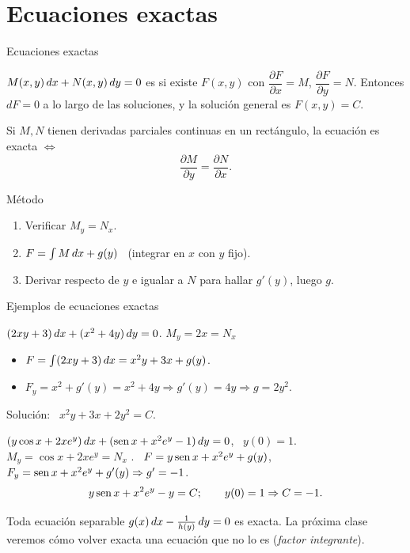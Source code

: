 \documentclass[10pt,aspectratio=169]{beamer}
\begin{document}
\section{Ecuaciones exactas}

\begin{frame}{Ecuaciones exactas}
  \begin{definicion}
    $M(x,y)\,dx+N(x,y)\,dy=0$ es  si existe $F(x,y)$ con $\dfrac{\partial F}{\partial x}=M$, $\dfrac{\partial F}{\partial y}=N$.
    Entonces $dF=0$ a lo largo de las soluciones, y la solución general es $\boxed{F(x,y)=C}$.
  \end{definicion}
  \begin{teorema}
    Si $M,N$ tienen derivadas parciales continuas en un rectángulo, la ecuación es exacta $\iff$
    \[ \frac{\partial M}{\partial y}=\frac{\partial N}{\partial x}. \]
  \end{teorema}
  \begin{block}{Método}
    \begin{enumerate}
      \item Verificar $M_y=N_x$.
      \item $F=\int M\,dx+g(y)$ \ (integrar en $x$ con $y$ fijo).
      \item Derivar respecto de $y$ e igualar a $N$ para hallar $g'(y)$, luego $g$.
    \end{enumerate}
  \end{block}
\end{frame}

\begin{frame}{Ejemplos de ecuaciones exactas}
  \begin{ejemplo}[7]
    $(2xy+3)\,dx+(x^2+4y)\,dy=0$. \quad $M_y=2x=N_x$ \checkmark
    \begin{itemize}
      \item $F=\int(2xy+3)\,dx=x^2y+3x+g(y)$.
      \item $F_y=x^2+g'(y)=x^2+4y\Rightarrow g'(y)=4y\Rightarrow g=2y^2$.
    \end{itemize}
    Solución: \ $x^2y+3x+2y^2=C$.
  \end{ejemplo}
  \begin{ejemplo}
    $(y\cos x+2xe^y)\,dx+(\operatorname{sen} x+x^2e^y-1)\,dy=0$, \ $y(0)=1$.\\
    $M_y=\cos x+2xe^y=N_x$ \checkmark. \ $F=y\operatorname{sen} x+x^2e^y+g(y)$, \ $F_y=\operatorname{sen} x+x^2e^y+g'(y)\Rightarrow g'=-1$.
    \[ y\operatorname{sen} x+x^2e^y-y=C;\qquad y(0)=1\Rightarrow C=-1. \]
  \end{ejemplo}
  \small Toda ecuación separable $g(x)\,dx-\frac{1}{h(y)}\,dy=0$ es exacta. La próxima clase veremos cómo volver exacta una ecuación
  que no lo es (\emph{factor integrante}).
\end{frame}
\end{document}
